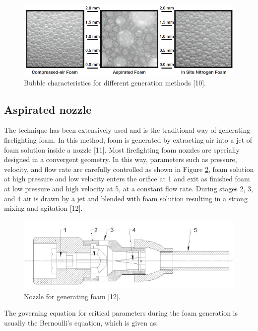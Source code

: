 \documentclass[12pt]{report}
\begin{document}
\begin{figure}[H]
    \centering
    \includegraphics[width=.95\textwidth]{bubble_characteristics.png}
    \caption{Bubble characteristics for different generation methods [10].}
    \label{ch2:figure:characteristics}
\end{figure}

\subsection{Aspirated nozzle}
The technique has been extensively used and is the traditional way of generating firefighting foam. In this method, foam is generated by extracting air into a jet of foam solution inside a nozzle [11]. Most firefighting foam nozzles are specially designed in a convergent geometry. In this way, parameters such as pressure, velocity, and flow rate are carefully controlled as shown in Figure \ref{ch2:figure:nozzle}, foam solution at high pressure and low velocity enters the orifice at 1 and exit as finished foam at low pressure and high velocity at 5, at a constant flow rate. During stages 2, 3, and 4 air is drawn by a jet and blended with foam solution resulting in a strong mixing and agitation [12].

\begin{figure}[H]
    \centering
    \includegraphics[width=\textwidth]{foam_generating_nozzle.png}
    \caption{Nozzle for generating foam [12].}
    \label{ch2:figure:nozzle}
\end{figure}

The governing equation for critical parameters during the foam generation is usually the Bernoulli’s equation, which is given as:
\end{document}
